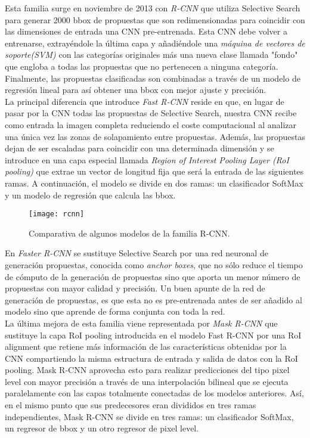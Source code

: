 Esta familia surge en noviembre de 2013 con \emph{R-CNN} \cite{2013arXiv1311.2524G} que utiliza Selective Search \cite{Selective Search for object recognition} para generar 2000 bbox de propuestas que son redimensionadas para coincidir con las dimensiones de entrada una CNN pre-entrenada. Esta CNN debe volver a entrenarse, extrayéndole la última capa y añadiéndole una \emph{máquina de vectores de soporte(SVM)} con las categorías originales más una nueva clase llamada "fondo" que engloba a todas las propuestas que no pertenecen a ninguna categoría. Finalmente, las propuestas clasificadas son combinadas a través de un modelo de regresión lineal para así obtener una bbox con mejor ajuste y precisión.\\

La principal diferencia que introduce \emph{Fast R-CNN} \cite{2015arXiv150408083G} reside en que, en lugar de pasar por la CNN todas las propuestas de Selective Search, nuestra CNN recibe como entrada la imagen completa reduciendo el coste computacional al analizar una única vez las zonas de solapamiento entre propuestas. Además, las propuestas dejan de ser escaladas para coincidir con una determinada dimensión y se introduce en una capa especial llamada \emph{Region of Interest Pooling Layer (RoI pooling)} que extrae un vector de longitud fija que será la entrada de las siguientes ramas. A continuación, el modelo se divide en dos ramas: un clasificador SoftMax y un modelo de regresión que calcula las bbox. \\

\begin{figure}[htpb]
  \centering
  \texttt{[image: rcnn]}
  \caption{Comparativa de algunos modelos de la familia R-CNN. \cite{2019arXiv190803673W}}
  \label{fig:r-cnn}
\end{figure}

En \emph{Faster R-CNN} \cite{2015arXiv150601497R} se sustituye Selective Search por una red neuronal de generación propuestas, conocida como \emph{anchor boxes}, que no sólo reduce el tiempo de cómputo de la generación de propuestas sino que aporta un menor número de propuestas con mayor calidad y precisión. Un buen apunte de la red de generación de propuestas, es que esta no es pre-entrenada antes de ser añadido al modelo sino que aprende de forma conjunta con toda la red.\\

La última mejora de esta familia viene representada por \emph{Mask R-CNN} \cite{2017arXiv170306870H} que sustituye la capa RoI pooling introducida en el modelo Fast R-CNN por una RoI alignment que retiene más información de las características obtenidas por la CNN compartiendo la misma estructura de entrada y salida de datos con la RoI pooling. Mask R-CNN aprovecha esto para realizar predicciones del tipo pixel level con mayor precisión a través de una interpolación bilineal que se ejecuta paralelamente con las capas totalmente conectadas de los modelos anteriores. Así, en el mismo punto que sus predecesores eran divididos en tres ramas independientes, Mask R-CNN se divide en tres ramas: un clasificador SoftMax, un regresor de bbox y un otro regresor de pixel level.\\

